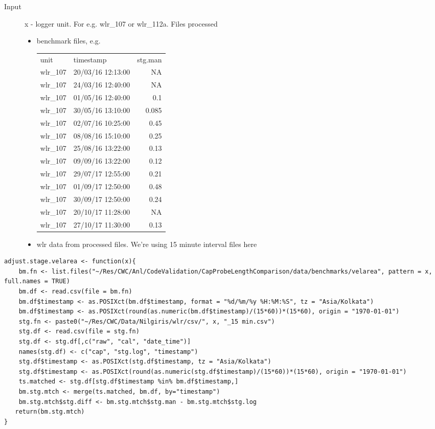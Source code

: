 \documentclass[a4paper]{article}
\begin{document}
\begin{description}
\item[{Input}] x - logger unit. For e.g. wlr\_107  or wlr\_112a. Files processed
\begin{itemize}
\item benchmark files, e.g.
\begin{center}
\begin{tabular}{llr}
unit & timestamp & stg.man\\
wlr\_107 & 20/03/16 12:13:00 & NA\\
wlr\_107 & 24/03/16 12:40:00 & NA\\
wlr\_107 & 01/05/16 12:40:00 & 0.1\\
wlr\_107 & 30/05/16 13:10:00 & 0.085\\
wlr\_107 & 02/07/16 10:25:00 & 0.45\\
wlr\_107 & 08/08/16 15:10:00 & 0.25\\
wlr\_107 & 25/08/16 13:22:00 & 0.13\\
wlr\_107 & 09/09/16 13:22:00 & 0.12\\
wlr\_107 & 29/07/17 12:55:00 & 0.21\\
wlr\_107 & 01/09/17 12:50:00 & 0.48\\
wlr\_107 & 30/09/17 12:50:00 & 0.24\\
wlr\_107 & 20/10/17 11:28:00 & NA\\
wlr\_107 & 27/10/17 11:30:00 & 0.13\\
\end{tabular}
\end{center}
\item wlr data from processed files. We're using 15 minute interval files here
\end{itemize}
\end{description}

\begin{verbatim}
adjust.stage.velarea <- function(x){
    bm.fn <- list.files("~/Res/CWC/Anl/CodeValidation/CapProbeLengthComparison/data/benchmarks/velarea", pattern = x, full.names = TRUE)
    bm.df <- read.csv(file = bm.fn)
    bm.df$timestamp <- as.POSIXct(bm.df$timestamp, format = "%d/%m/%y %H:%M:%S", tz = "Asia/Kolkata")
    bm.df$timestamp <- as.POSIXct(round(as.numeric(bm.df$timestamp)/(15*60))*(15*60), origin = "1970-01-01")
    stg.fn <- paste0("~/Res/CWC/Data/Nilgiris/wlr/csv/", x, "_15 min.csv")
    stg.df <- read.csv(file = stg.fn)
    stg.df <- stg.df[,c("raw", "cal", "date_time")]
    names(stg.df) <- c("cap", "stg.log", "timestamp")
    stg.df$timestamp <- as.POSIXct(stg.df$timestamp, tz = "Asia/Kolkata")
    stg.df$timestamp <- as.POSIXct(round(as.numeric(stg.df$timestamp)/(15*60))*(15*60), origin = "1970-01-01")
    ts.matched <- stg.df[stg.df$timestamp %in% bm.df$timestamp,]
    bm.stg.mtch <- merge(ts.matched, bm.df, by="timestamp")
    bm.stg.mtch$stg.diff <- bm.stg.mtch$stg.man - bm.stg.mtch$stg.log
   return(bm.stg.mtch)
}
\end{verbatim}
\end{document}
